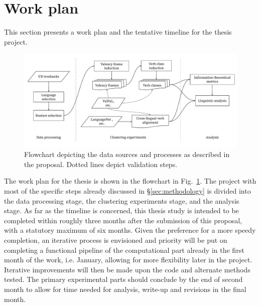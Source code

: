 \section{Work plan}\label{sec:plan}

This section presents a work plan and the tentative timeline for the thesis project.

\begin{figure}[h!]
    \centering
    \begin{adjustbox}{center,scale=0.65}
    \includegraphics{figures/proposal_flowchart.pdf}
    \end{adjustbox}
    \caption{Flowchart depicting the data sources and processes as described in the proposal. Dotted lines depict validation steps.}\label{fig:flowchart}
\end{figure}

The work plan for the thesis is shown in the flowchart in Fig.~\ref{fig:flowchart}. The project with most of the specific steps already discussed in \S\ref{sec:methodology} is divided into the data processing stage, the clustering experiments stage, and the analysis stage. As far as the timeline is concerned, this thesis study is intended to be completed within roughly three months after the submission of this proposal, with a statutory maximum of six months. Given the preference for a more speedy completion, an iterative process is envisioned and priority will be put on completing a functional pipeline of the computational part already in the first month of the work, i.e. January, allowing for more flexibility later in the project. Iterative improvements will then be made upon the code and alternate methods tested. The primary experimental parts should conclude by the end of second month to allow for time needed for analysis, write-up and revisions in the final month. 
